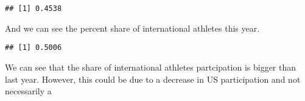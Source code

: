 \documentclass[]{article}
\newenvironment{Shaded}{\begin{snugshade}}{\end{snugshade}}
\newcommand{\KeywordTok}[1]{\textcolor[rgb]{0.13,0.29,0.53}{\textbf{#1}}}
\newcommand{\DecValTok}[1]{\textcolor[rgb]{0.00,0.00,0.81}{#1}}
\newcommand{\OperatorTok}[1]{\textcolor[rgb]{0.81,0.36,0.00}{\textbf{#1}}}
\newcommand{\NormalTok}[1]{#1}
\begin{document}
\begin{Shaded}
\end{Shaded}

\begin{verbatim}
## [1] 0.4538
\end{verbatim}

And we can see the percent share of international athletes this year.

\begin{Shaded}
\end{Shaded}

\begin{verbatim}
## [1] 0.5006
\end{verbatim}

We can see that the share of international athletes partcipation is
bigger than last year. However, this could be due to a decrease in US
participation and not necessarily a
\end{document}
